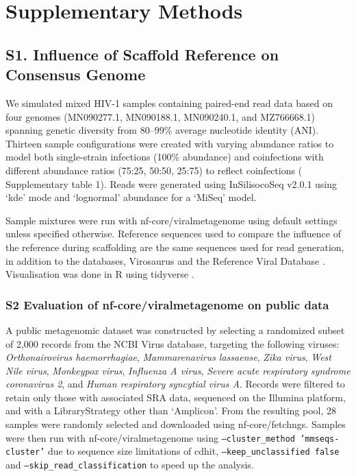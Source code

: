 
\section*{Supplementary Methods}

\subsection*{S1. Influence of Scaffold Reference on Consensus Genome}

We simulated mixed  HIV-1 samples containing paired-end read data based on four genomes (MN090277.1, MN090188.1, MN090240.1, and MZ766668.1) spanning genetic diversity from 80–99\% average nucleotide identity (ANI). Thirteen sample configurations were created with varying abundance ratios to model both single-strain infections (100\% abundance) and coinfections with different abundance ratios (75:25, 50:50, 25:75) to reflect coinfections ( Supplementary table 1). Reads were generated using InSilisocoSeq v2.0.1 \cite{Gourle2019-ox} using ‘kde’ mode and ‘lognormal’ abundance for a ‘MiSeq’ model.

Sample mixtures were run with nf-core/viralmetagenome using default settings unless specified otherwise. Reference sequences used to compare the influence of the reference during scaffolding are the same sequences used for read generation, in addition to the databases, Virosaurus \cite{Gleizes2020-rq} and the Reference Viral Database \cite{Goodacre2018-dw}. Visualisation was done in R \cite{R_Core_Team2021-ow} using tidyverse \cite{Wickham2019-vr}.


\subsubsection*{S2 Evaluation of nf-core/viralmetagenome on public data}

A public metagenomic dataset was constructed by selecting a randomized subset of 2,000 records from the NCBI Virus database, targeting the following viruses: \textit{Orthonairovirus haemorrhagiae}, \textit{Mammarenavirus lassaense}, \textit{Zika virus}, \textit{West Nile virus}, \textit{Monkeypox virus}, \textit{Influenza A virus}, \textit{Severe acute respiratory syndrome coronavirus 2}, and \textit{Human respiratory syncytial virus A}. Records were filtered to retain only those with associated SRA data, sequenced on the Illumina platform, and with a LibraryStrategy other than ‘Amplicon’. From the resulting pool, 28 samples were randomly selected and downloaded using nf-core/fetchngs. Samples were then run with nf-core/viralmetagenome using \texttt{--cluster\_method 'mmseqs-cluster'} due to sequence size limitations of cdhit, \texttt{--keep\_unclassified false} and \texttt{--skip\_read\_classification} to speed up the analysis.

